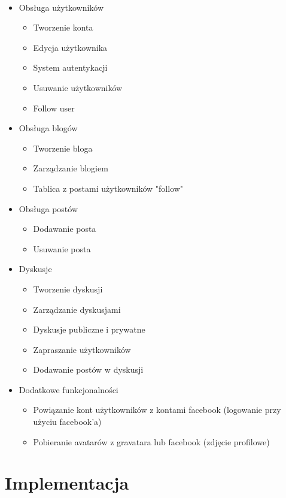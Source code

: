 \documentclass[wide,a4paper,titlepage,12pt] {article}
\begin{document}
  \paragraph{}
  \begin{itemize}
   \item Obsługa użytkowników
   \begin{itemize}
    \item Tworzenie konta
    \item Edycja użytkownika
    \item System autentykacji
    \item Usuwanie użytkowników
    \item Follow user
   \end{itemize}
   \item Obsługa blogów
    \begin{itemize}
      \item Tworzenie bloga
      \item Zarządzanie blogiem
      \item Tablica z postami użytkowników "follow"
    \end{itemize}
   \item Obsługa postów
    \begin{itemize}
      \item Dodawanie posta
      \item Usuwanie posta
    \end{itemize}
  \item Dyskusje
    \begin{itemize}
      \item Tworzenie dyskusji
      \item Zarządzanie dyskusjami
      \item Dyskusje publiczne i prywatne
      \item Zapraszanie użytkowników
      \item Dodawanie postów w dyskusji
    \end{itemize}
  \item Dodatkowe funkcjonalności
    \begin{itemize}
      \item Powiązanie kont użytkowników z kontami facebook (logowanie przy użyciu facebook'a)
      \item Pobieranie avatarów z gravatara lub facebook (zdjęcie profilowe) 
    \end{itemize}
  \end{itemize}
  \section{Implementacja}
\end{document}
